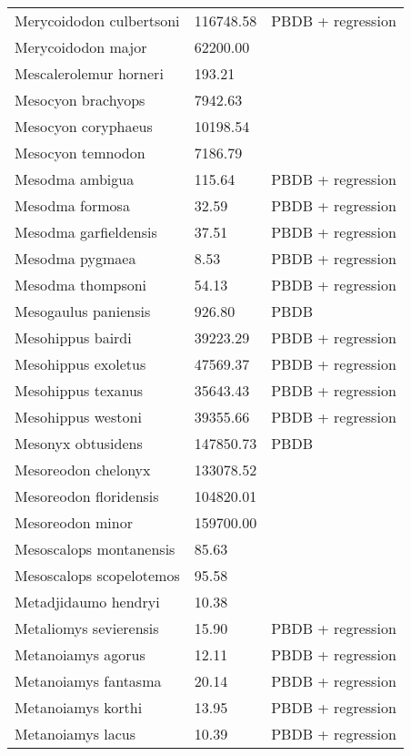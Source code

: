 \documentclass{article}
\begin{document}
\begin{center}
\begin{longtable}{p{} p{} p{} }
  Merycoidodon culbertsoni & 116748.58 & PBDB + regression \\ 
  Merycoidodon major & 62200.00 & \cite{McKenna2011} \\ 
  Mescalerolemur horneri & 193.21 & \cite{MacIntyre1966} \\ 
  Mesocyon brachyops & 7942.63 & \cite{Tomiya2013} \\ 
  Mesocyon coryphaeus & 10198.54 & \cite{Tomiya2013} \\ 
  Mesocyon temnodon & 7186.79 & \cite{Tomiya2013} \\ 
  Mesodma ambigua & 115.64 & PBDB + regression \\ 
  Mesodma formosa & 32.59 & PBDB + regression \\ 
  Mesodma garfieldensis & 37.51 & PBDB + regression \\ 
  Mesodma pygmaea & 8.53 & PBDB + regression \\ 
  Mesodma thompsoni & 54.13 & PBDB + regression \\ 
  Mesogaulus paniensis & 926.80 & PBDB \\ 
  Mesohippus bairdi & 39223.29 & PBDB + regression \\ 
  Mesohippus exoletus & 47569.37 & PBDB + regression \\ 
  Mesohippus texanus & 35643.43 & PBDB + regression \\ 
  Mesohippus westoni & 39355.66 & PBDB + regression \\ 
  Mesonyx obtusidens & 147850.73 & PBDB \\ 
  Mesoreodon chelonyx & 133078.52 & \cite{Bever2003} \\ 
  Mesoreodon floridensis & 104820.01 & \cite{Tomiya2013} \\ 
  Mesoreodon minor & 159700.00 & \cite{McKenna2011} \\ 
  Mesoscalops montanensis & 85.63 & \cite{Tomiya2013} \\ 
  Mesoscalops scopelotemos & 95.58 & \cite{Tomiya2013} \\ 
  Metadjidaumo hendryi & 10.38 & \cite{Tomiya2013} \\ 
  Metaliomys sevierensis & 15.90 & PBDB + regression \\ 
  Metanoiamys agorus & 12.11 & PBDB + regression \\ 
  Metanoiamys fantasma & 20.14 & PBDB + regression \\ 
  Metanoiamys korthi & 13.95 & PBDB + regression \\ 
  Metanoiamys lacus & 10.39 & PBDB + regression \\ 

\end{longtable}
\end{center}
\end{document}
